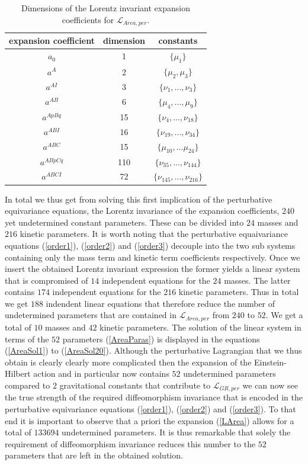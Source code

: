 \documentclass[a4paper,12pt, DIV=14, BCOR=5mm, twoside, headsepline]{scrbook}
\begin{document}
\begin{table}
\centering 
\begin{tabular}{c|c|c}
    expansion coefficient & dimension & constants   \\
    \hline 
    $a_0$ & 1 & $\{\mu_1\}$ \\
    $a^A$ & 2 & $\{\mu_2,\mu_3\}$ \\
    $a^{AI}$ & 3 & $\{\nu_1,..., \nu_3\}$ \\
    $a^{AB}$ & 6 & $\{\mu_4,..., \mu_9 \} $ \\
    $a^{ApBq}$ & 15 & $\{\nu_4,...,\nu_{18}\}$ \\
    $a^{ABI}$ & 16 & $\{ \nu_{19},...,\nu_{34} \}$ \\
    $a^{ABC}$ & 15 & $\{ \mu_{10},...\mu_{24} \}$\\
    $a^{ABpCq}$ & 110 & $\{\nu_{35},...,\nu_{144} \}$ \\
    $a^{ABCI}$ & 72 & $\{ \nu_{145},...,\nu_{216}\}$
\end{tabular}
\caption{Dimensions of the Lorentz invariant expansion coefficients for $\mathcal{L}_{Area,per}$.}\label{AreaExp}
\end{table}
In total we thus get from solving this first implication of the perturbative equivariance equations, the Lorentz invariance of the expansion coefficients, $240$ yet undetermined constant parameters. These can be divided into $24$ masses and $216$ kinetic parameters. It is worth noting that the perturbative equaivariance equations (\ref{order1}), (\ref{order2}) and (\ref{order3}) decouple into the two sub systems containing only the mass term and kinetic term coefficients respectively. Once we insert the obtained Lorentz invariant expression the former yields a linear system that is compromised of $14$ independent equations for the $24$ masses. The latter contains $174$ independent equations for the $216$ kinetic parameters. Thus in total we get $188$ indendent linear equations that therefore reduce the number of undetermined parameters that are contained in $\mathcal{L}_{Area,per}$ from $240$ to $52$. We get a total of $10$ masses and $42$ kinetic parameters. The solution of the linear system in terms of the $52$ parameters (\ref{AreaParas}) is displayed in the equations (\ref{AreaSol1}) to (\ref{AreaSol20}). Although the perturbative Lagrangian that we thus obtain is clearly clearly more complicated then the expansion of the Einstein-Hilbert action and in particular now contains $52$ undetermined parameters compared to $2$ gravitational constants that contribute to $\mathcal{L}_{GR,per}$ we can now see the true strength of the required diffeomorphism invariance that is encoded in the perturbative equivariance equations (\ref{order1}), (\ref{order2}) and (\ref{order3}). To that end it is important to observe that a priori the expansion (\ref{LArea}) allows for a total of $133694$ undetermined parameters. It is thus remarkable that solely the requirement of diffeomorphism invariance reduces this number to the $52$ parameters that are left in the obtained solution. \\
\end{document}
